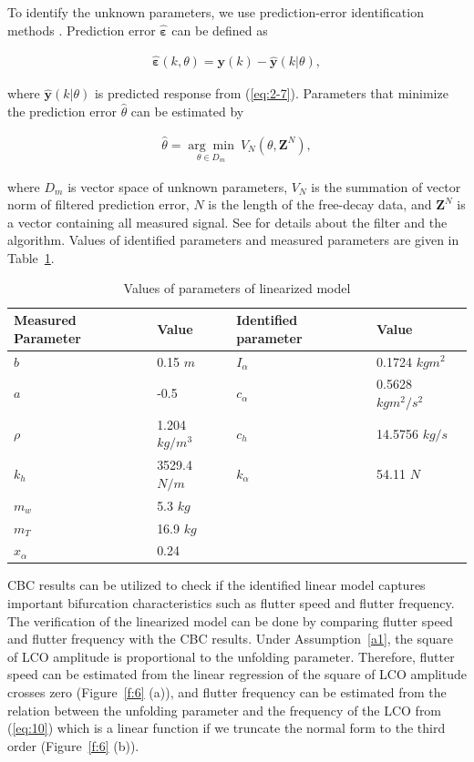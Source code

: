 \documentclass[openacc]{rsproca_new}%
\def\epsilon{\varepsilon}
\def\vec#1{\ensuremath{\mathbf{#1}}}
\newcommand{\Eref}[1]{(\ref{#1})}
\newcommand{\Fref}[1]{Figure~\ref{#1}}
\newcommand{\Tref}[1]{Table~\ref{#1}}
\newcommand{\asref}[1]{Assumption~\ref{#1}}
\begin{document}
\noindent To identify the unknown parameters, we use prediction-error identification methods \cite{ljung2001system}. Prediction error \vec{\hat \epsilon} can be defined as

\begin{align}\label{eq:2-9}
\vec{\hat \epsilon}(k,\theta)=\vec{y}(k)-\hat{\vec{y}}(k|\theta),
\end{align}

\noindent where $\hat{\vec{y}}(k|\theta)$ is predicted response from \Eref{eq:2-7}. Parameters that minimize the prediction error $\hat \theta$ can be estimated by

\begin{align}\label{eq:2-10}
\hat{\theta}=\underset{\theta \in D_m}{\arg\min} \: V_N(\theta,\vec{Z}^N),
\end{align}

\noindent where $D_m$ is vector space of unknown parameters, $V_N$ is the summation of vector norm of filtered prediction error, $N$ is the length of the free-decay data, and $\vec{Z}^N$ is a vector containing all measured signal. See \cite{ljung2001system} for details about the filter and the algorithm. Values of identified parameters and measured parameters are given in \Tref{t2}.

\begin{table}[!ht]
\caption{Values of parameters of linearized model}%
\label{t2}
\begin{tabular}{llll}%
\hline
Measured Parameter & Value & Identified parameter & Value \\
\hline
$b$ & 0.15  $m$ & $I_{\alpha}$ & 0.1724  $kgm^2$ \\
$a$ & -0.5 & $c_\alpha$ & 0.5628  $kgm^2/s^2$ \\
$\rho$ & 1.204  $kg/m^3$ & $c_h$  & 14.5756  $kg/s$ \\
$k_{h}$ & 3529.4  $N/m$ & $k_\alpha$ & 54.11  $N$ \\
$m_w$ & 5.3  $kg$ & & \\
$m_T$ &  16.9  $kg$ & &  \\
$x_\alpha$ & 0.24 & & \\
\hline
\end{tabular}
\vspace*{-4pt}
\end{table}%

\noindent CBC results can be utilized to check if the identified linear model captures important bifurcation characteristics such as flutter speed and flutter frequency. The verification of the linearized model can be done by comparing flutter speed and flutter frequency with the CBC results. Under \asref{a1}, the square of LCO amplitude is proportional to the unfolding parameter. Therefore, flutter speed can be estimated from the linear regression of the square of LCO amplitude crosses zero (\Fref{f:6} (a)), and flutter frequency can be estimated from the relation between the unfolding parameter and the frequency of the LCO from \Eref{eq:10} which is a linear function if we truncate the normal form to the third order (\Fref{f:6} (b)).
\end{document}
